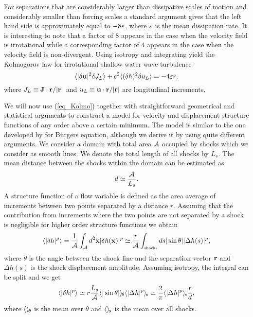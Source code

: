 For separations that are considerably larger than dissipative scales of motion
and considerably smaller than forcing scales a standard argument \cite[see for
example][]{Frisch} gives that the left hand side is approximately equal to $ -8
\varepsilon $, where $ \varepsilon $ is the mean dissipation rate. It is interesting to note
that a factor of $ 8 $ appears in the case when the velocity field is
irrotational while a corresponding factor of $ 4 $ appears in the case when the
velocity field is non-divergent. Using isotropy and integrating yield the
Kolmogorov law for irrotational shallow water wave turbulence
\begin{equation}
\langle  |\delta \textbf{u}|^2 \delta J_L  \rangle
+ c^2\langle  (\delta h)^2 \delta u_L  \rangle = -4 \varepsilon r, \label{eq_Kolmo}
\end{equation}
where $J_L \equiv
\textbf{J}\cdot\textbf{r} / |\textbf{r}|$ and $u_L \equiv \textbf{u}\cdot\textbf{r} / |\textbf{r}|$ are
longitudinal increments.




We will now use (\ref{eq_Kolmo}) together with straightforward geometrical and
statistical arguments to construct a model for velocity and displacement
structure functions of any order above a certain minimum. The model is similar
to the one developed by \cite{BouchaudMezardParisi1995} for Burgers equation,
although we derive it by using quite different arguments. We consider a domain
with total area $ {\mathcal{A}} $ occupied by shocks which we consider as smooth lines.
We denote the total length of all shocks by $ L_s $. The mean distance between
the shocks within the domain can be estimated as
\begin{equation}
d \simeq \frac{\mathcal{A}} {L_s} .
\end{equation}
A structure function of a flow variable is defined as the area average of increments  between two points separated by a distance $ r $.
Assuming that the contribution from increments where the two points are not separated by a shock is negligible for higher order structure functions we obtain
\begin{eqnarray}
\meane{|\delta h|^p}
=  \frac{1}{\mA} \int_{\mA}  d^2\xx |\delta h(\xx)|^p
 \simeq  \frac{r}{\mA} \int_\shocks ds |\sin\theta| |\Delta h (s)|^p,
\end{eqnarray}
where $\theta$ is the angle between the shock line and the separation
vector $\textbf{r}$ %
and $\Delta h (s)$ is the shock displacement amplitude.
%
Assuming isotropy, the integral can be split and we get
\begin{equation} \label{StepH}
\langle |\delta h|^p \rangle
\simeq
r \frac{L_s}{\mathcal{A}} {\langle |\sin\theta| \rangle_{\hspace{-0.4mm}\theta}} {\langle |\Delta h |^p \rangle_{\hspace{-0.4mm}s}}
\simeq  \frac{2}{\pi} {\langle |\Delta h |^p \rangle_{\hspace{-0.4mm}s}} \frac{r}{d} ,
\end{equation}
where ${\langle  \rangle_{\hspace{-0.4mm}\theta}}$ is the mean over $\theta$
and ${\langle  \rangle_{\hspace{-0.4mm}s}}$ is the mean over all shocks.

